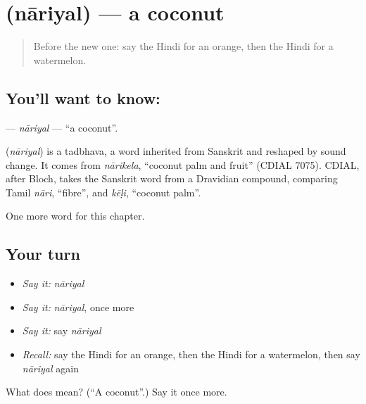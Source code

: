 \section[\texorpdfstring{\hi{नारियल} (nāriyal)}{नारियल (nāriyal)}]{ (nāriyal) — a coconut}

\label{lesson:HI-C140-nariyal}



\begin{quote}
Before the new one: say the Hindi for an orange, then the Hindi for a watermelon.
\end{quote}

\subsection*{You'll want to know: }
\textbf{} — \emph{nāriyal} — \textquotedblleft{}a coconut\textquotedblright{}.

\begin{cousinweb}
\textbf{} (\emph{nāriyal}) is a tadbhava, a word inherited from Sanskrit and reshaped by sound change. It comes from \emph{nārikela}, \textquotedblleft{}coconut palm and fruit\textquotedblright{} (CDIAL 7075). CDIAL, after Bloch, takes the Sanskrit word from a Dravidian compound, comparing Tamil \emph{nāri}, \textquotedblleft{}fibre\textquotedblright{}, and \emph{kēḷi}, \textquotedblleft{}coconut palm\textquotedblright{}.
\end{cousinweb}

\begin{grammarlens}[title={What you've built}]
One more word for this chapter.
\end{grammarlens}

\subsection*{Your turn}
\begin{itemize}
\raggedright
  \item \emph{Say it:} \emph{nāriyal}
  \item \emph{Say it:} \emph{nāriyal}, once more
  \item \emph{Say it:} say \emph{nāriyal}
  \item \emph{Recall:} say the Hindi for an orange, then the Hindi for a watermelon, then say \emph{nāriyal} again
\end{itemize}

\begin{tcolorbox}[breakable,colback=teal!4,colframe=teal!35!black,title={Before you move on}]
What does  mean? (\textquotedblleft{}A coconut\textquotedblright{}.) Say it once more.
\end{tcolorbox}
